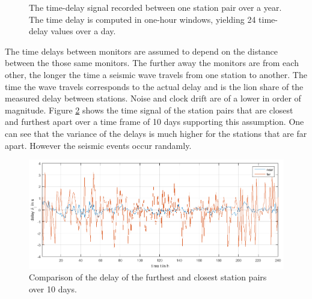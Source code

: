 \documentclass[12pt, sumlimits, intlimits]{article}
\begin{document}
\begin{figure}[ht] 
	\centering 
	\caption{The time-delay signal recorded between one station pair over a year. The time delay is computed in one-hour windows, yielding 24 time-delay values over a day.}
	\label{fig:examplesignal}
\end{figure}

The time delays between monitors are assumed to depend on the distance between the those same monitors. The further away the monitors are from each other, the longer the time a seismic wave travels from one station to  another. The time the wave travels corresponds to the actual delay and is the lion share of the measured delay between stations. Noise and clock drift are of a lower in order of magnitude. Figure \ref{fig:nearfar} shows the time signal of the station pairs that are closest and furthest apart over a time frame of 10 days supporting this assumption. One can see that the variance of the delays is much higher for the stations that are far apart. However the seismic events occur randamly.

\begin{figure}[ht]
	\begin{center}   
		\includegraphics[width=\textwidth]{../figures/Comparisondelayoverrandomdayoffarestandclosestlinks.png}
	\end{center}
	\caption{Comparison of the delay of the furthest and closest station pairs over 10 days.}\label{fig:nearfar}
\end{figure}
\end{document}
